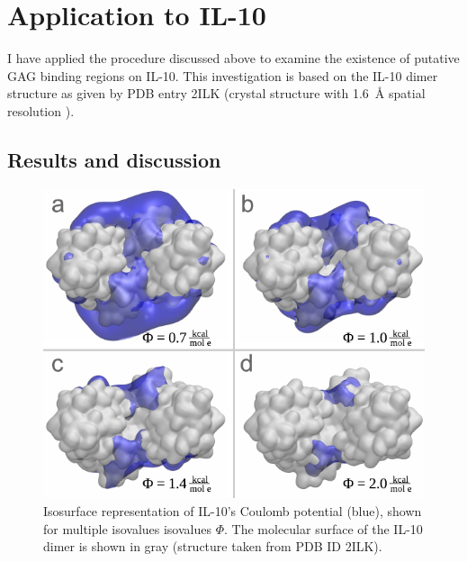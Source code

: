 

\section{Application to IL-10}

I have applied the procedure discussed above to examine the existence of
putative GAG binding regions on IL-10. This investigation is based on the IL-10
dimer structure as given by PDB entry 2ILK (crystal structure with
\SI{1.6}{\angstrom} spatial resolution \cite{Zdanov1996}).

\subsection{Results and discussion}
\label{bspred:il10}

\begin{figure}
\centering
\includegraphics[width=1.0\textwidth]{gfx/bspred/il10_top_coulomb_isosurfaces_different_values_03_ds.pdf}
\caption[]{
Isosurface representation of IL-10's Coulomb potential (blue), shown for
multiple isovalues isovalues $\Phi$. The molecular surface of the IL-10 dimer is
shown in gray (structure taken from PDB ID 2ILK).
}
\label{fig:bspred:il10_multi_iso}
\end{figure}



